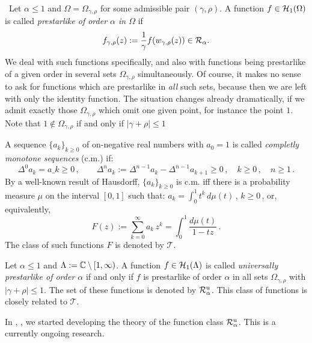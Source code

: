 \vspace{2ex}\ 
Let $\alpha\leq1$ and $\Omega=\Omega_{\gamma,\rho}$ for some
admissible pair $(\gamma,\rho)$.
A function $f\in{\mathcal H }_1(\Omega)$ is  called {\em prestarlike of order
$\alpha$ in $\Omega$ } if 
$$
f_{\gamma,\rho}(z):=\frac{1}{\gamma}f(w_{\gamma,\rho}(z))\in{\mathcal R}_\alpha.
$$
We deal with such functions specifically, and also with functions being
prestarlike of a given order in several sets $\Omega_{\gamma,\rho}$
simultaneously. 
Of course, it makes no sense to ask for functions which are prestarlike in
{\em all } such sets, because then we are left  with only the identity
function.
The situation changes already dramatically, if we admit exactly those
$\Omega_{\gamma,\rho}$ which omit one given point, for instance the point $1$. 
Note that $1\not\in\Omega_{\gamma,\rho}$ if and only if $|\gamma+\rho|\leq1$ 

A sequence $\{a_k\}_{k\geq0}$ of on-negative real numbers with $a_0=1$
is called {\em completly monotone sequences\/} (c.m.) if:
\begin{equation}
\Delta^0a_k=a\_k\geq0\,,\qquad 
\Delta^na_k := \Delta^{n-1}a_k - \Delta^{n-1}a_{k+1}\geq0\,,\quad
k\geq0\,,\quad n\geq1\,.
\end{equation}
By a well-known result of Hausdorff, $\{a_k\}_{k\geq0}$ is c.m. iff there
is a probability measure $\mu$ on the interval $[0,1]$ such that:
$a_k=\int_0^1t^k\,d\mu(t)$\,, $k\geq0$\,,
or, equivalently,
\begin{equation}
F(z):=\sum_{k=0}^{\infty} a_k\,z^k = \int_0^1 \frac{d\mu(t)}{1-tz}\,.
\end{equation}
The class of such functions $F$ is denoted by $\mathcal{T}$.

Let $\alpha\leq1$ and $\Lambda:={\mathbb C }\setminus[1,\infty)$.
A function $f\in{\mathcal H }_1(\Lambda)$ is called
{\em universally prestarlike of order $\alpha$\/} if and only if $f$
is prestarlike of order $\alpha$ in all sets $\Omega_{\gamma,\rho}$ with
$|\gamma+\rho|\leq1$.
The set of these functions is denoted by ${\mathcal R}^{\rm u}_\alpha$.
This class of functions is closely related to $\mathcal{T}$.

In \cite{RS}, \cite{RSS}, \cite{barusa} we started developing the
theory of the function class ${\mathcal R}^{\rm u}_\alpha$.
This is a currently ongoing research.

